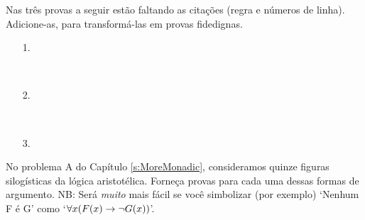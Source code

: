 \problempart 
\label{pr.justifyFOLproof}
Nas três provas a seguir estão faltando as citações (regra e
números de linha). Adicione-as, para transformá-las em provas fidedignas.

\begin{itemize}
\item[1.] \begin{fitchproof}
	\open
	\close
{} {}
\end{fitchproof}

\item[] \

\item[2.] \begin{fitchproof}
 {}
 {}
\end{fitchproof}

\item[] \ 

\item[3.] \begin{fitchproof}
\open
\close
{}
\end{fitchproof}
\end{itemize}
 
\problempart
\label{pr.BarbaraEtc.proof1}
No problema A do Capítulo  \ref{s:MoreMonadic}, consideramos quinze figuras silogísticas da lógica aristotélica. Forneça provas para cada uma dessas formas de argumento. NB: Será \emph{muito} mais fácil se você simbolizar (por exemplo) `Nenhum F é G' como `$\forall x (\mathord{F}(x) \rightarrow \neg \mathord{G}(x))$'.

